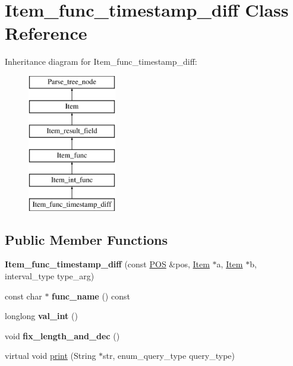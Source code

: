 \hypertarget{classItem__func__timestamp__diff}{}\section{Item\+\_\+func\+\_\+timestamp\+\_\+diff Class Reference}
\label{classItem__func__timestamp__diff}
Inheritance diagram for Item\+\_\+func\+\_\+timestamp\+\_\+diff\+:\begin{figure}[H]
\begin{center}
\leavevmode
\includegraphics[height=6.000000cm]{classItem__func__timestamp__diff}
\end{center}
\end{figure}
\subsection*{Public Member Functions}
\begin{DoxyCompactItemize}
\item 
\mbox{\label{classItem__func__timestamp__diff_abb81118462321cdb8ba8cdacfd1b34a0}} 
{\bfseries Item\+\_\+func\+\_\+timestamp\+\_\+diff} (const \mbox{\hyperlink{structYYLTYPE}{P\+OS}} \&pos, \mbox{\hyperlink{classItem}{Item}} $\ast$a, \mbox{\hyperlink{classItem}{Item}} $\ast$b, interval\+\_\+type type\+\_\+arg)
\item 
\mbox{\label{classItem__func__timestamp__diff_a0b04154ee067c219fbf74254985a6ba0}} 
const char $\ast$ {\bfseries func\+\_\+name} () const
\item 
\mbox{\label{classItem__func__timestamp__diff_ae9b9cd2b9d9773e529ff0c3aa9074d5b}} 
longlong {\bfseries val\+\_\+int} ()
\item 
\mbox{\label{classItem__func__timestamp__diff_ace1cb6a548941afcf5bdcee926ff0c77}} 
void {\bfseries fix\+\_\+length\+\_\+and\+\_\+dec} ()
\item 
virtual void \mbox{\hyperlink{classItem__func__timestamp__diff_ad6f3cff0c7490aaabba3e11f18de66ec}{print}} (String $\ast$str, enum\+\_\+query\+\_\+type query\+\_\+type)
\end{DoxyCompactItemize}
